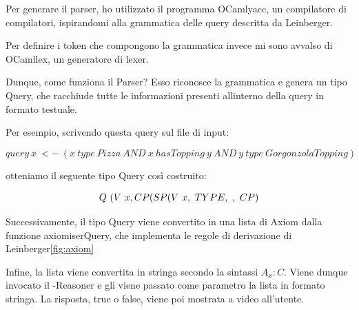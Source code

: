         Per generare il parser, ho utilizzato il programma OCamlyacc, un compilatore di compilatori, ispirandomi alla grammatica delle query descritta da Leinberger. %

        Per definire i token che compongono la grammatica invece mi sono avvalso di OCamllex, un generatore di lexer. 

        Dunque, come funziona il Parser? Esso riconosce la grammatica e genera un tipo Query, che racchiude tutte le informazioni presenti allinterno della query in formato testuale. 

        Per esempio, scrivendo questa query sul file di input: 
        
        $$ query \ x \ <- \ (x \ type \ Pizza \ AND \ x \ hasTopping \ y \ AND \ y \ type \ GorgonzolaTopping) $$
        
        otteniamo il seguente tipo Query così costruito: %

        $$ Q \  (V \ x, \\
            CP(SP(V \ x,\ TYPE, \ ,\ CP)$$

        Successivamente, il tipo Query viene convertito in una lista di Axiom dalla funzione axiomiserQuery, che implementa le regole di derivazione di Leinberger\ref{fig:axiom}



        

        
        Infine, la lista viene convertita in stringa secondo la sintassi \(A_{x} : C\). Viene dunque invocato il -Reasoner e gli viene passato come parametro la lista in formato stringa. La risposta, true o false, viene poi mostrata a video all'utente. 
    
    \newpage
